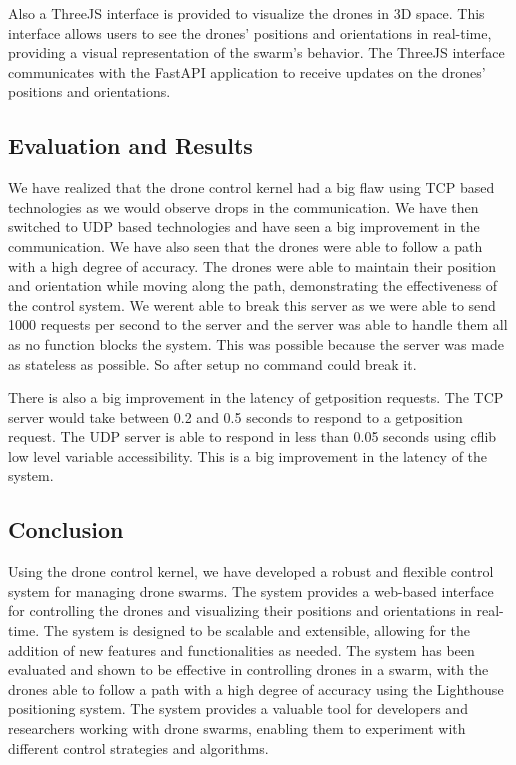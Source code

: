 Also a ThreeJS interface is provided to visualize the drones in \gls{3D} space. This interface allows users to see the drones' positions and orientations in real-time, providing a visual representation of the swarm's behavior. The ThreeJS interface communicates with the FastAPI application to receive updates on the drones' positions and orientations.
\subsection{Evaluation and Results}

We have realized that the drone control kernel had a big flaw using TCP based technologies as we would observe drops in the communication. We have then switched to UDP based technologies and have seen a big improvement in the communication. We have also seen that the drones were able to follow a path with a high degree of accuracy. The drones were able to maintain their position and orientation while moving along the path, demonstrating the effectiveness of the control system.
We werent able to break this server as we were able to send 1000 requests per second to the server and the server was able to handle them all as no function blocks the system.
This was possible because the server was made as stateless as possible. So after setup no command could break it.

There is also a big improvement in the latency of getposition requests. The TCP server would take between 0.2 and 0.5 seconds to respond to a getposition request. The UDP server is able to respond in less than 0.05 seconds using cflib low level variable accessibility. This is a big improvement in the latency of the system.
\subsection{Conclusion}

Using the drone control kernel, we have developed a robust and flexible control system for managing drone swarms. The system provides a web-based interface for controlling the drones and visualizing their positions and orientations in real-time. The system is designed to be scalable and extensible, allowing for the addition of new features and functionalities as needed. The system has been evaluated and shown to be effective in controlling drones in a swarm, with the drones able to follow a path with a high degree of accuracy using the Lighthouse positioning system. The system provides a valuable tool for developers and researchers working with drone swarms, enabling them to experiment with different control strategies and algorithms.
